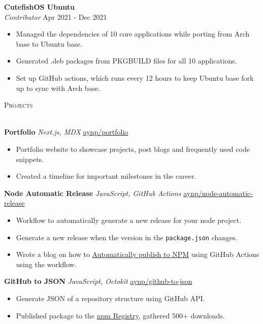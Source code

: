 \documentclass[a4paper]{article}
\newcommand{\lineunder} {
    \vspace*{-8pt} \\
    \hspace*{-18pt} \hrulefill \\
}
\newcommand{\header} [1] {
    {\hspace*{-18pt}\vspace*{6pt} \textsc{#1}}
    \vspace*{-6pt} \lineunder
}
\begin{document}
\textbf{CutefishOS Ubuntu}\\
\textit{Contributor} \hfill Apr 2021 - Dec 2021\\
\begin{itemize}
	\item Managed the dependencies of 10 core applications while porting from Arch base to Ubuntu base.
	\item Generated .deb packages from PKGBUILD files for all 10 applications.
	\item Set up GitHub actions, which runs every 12 hours to keep Ubuntu base fork up to sync with Arch base.
\end{itemize}
\vspace{1.5mm}


\header{Projects}
\vspace{1mm}

{\textbf{Portfolio}} {\sl Next.js, MDX} \hfill \href{https://github.com/aynp/portfolio}{aynp/portfolio}\\
\begin{itemize}
	\item Portfolio website to showcase projects, post blogs and frequently used code snippets.
	\item Created a timeline for important milestones in the career.
\end{itemize}
\vspace*{1.5mm}

{\textbf{Node Automatic Release}} {\sl JavaScript, GitHub Actions} \hfill \href{https://github.com/aynp/node-automatic-release/}{aynp/node-automatic-release}\\
\begin{itemize}
	\item Workflow to automatically generate a new release for your node project.
	\item Generate a new release when the version in the \texttt{package.json} changes.
	\item Wrote a blog on how to \href{https://aryanpathania.vercel.app/blog/automatic-npm-publish}{Automatically publish to NPM} using GitHub Actions using the workflow.
\end{itemize}
\vspace*{1.5mm}

{\textbf{GitHub to JSON}} {\sl JavaScript, Octokit} \hfill \href{https://github.com/aynp/github-to-json/}{aynp/github-to-json}\\
\begin{itemize}
	\item Generate JSON of a repository structure using GitHub API.
	\item Published package to the \href{https://www.npmjs.com/package/github-to-json}{npm Registry}, gathered 500+ downloads.
\end{itemize}
\vspace*{1.5mm}
\end{document}
